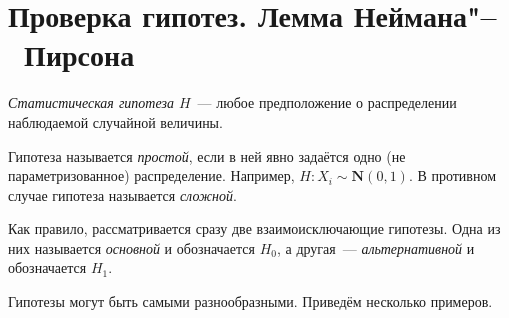 \section{Проверка гипотез. Лемма Неймана"--~Пирсона}

\begin{defn}
    \textit{Статистическая гипотеза $H$}~--- любое предположение о распределении наблюдаемой случайной величины.
    
    Гипотеза называется \textit{простой}, если в ней явно задаётся одно (не параметризованное) распределение. 
    Например, $H\colon X_i \sim \mathbf{N}(0, 1)$. 
    В противном случае гипотеза называется \textit{сложной}.

    Как правило, рассматривается сразу две взаимоисключающие гипотезы.
    Одна из них называется \textit{основной} и обозначается $H_0$, а другая~--- \textit{альтернативной} и обозначается $H_1$.
\end{defn}

Гипотезы могут быть самыми разнообразными.
Приведём несколько примеров.


